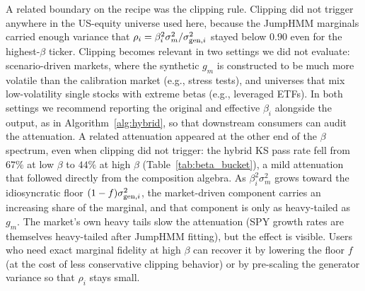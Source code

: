 A related boundary on the recipe was the clipping rule. Clipping
did not trigger anywhere in the US-equity universe used here,
because the JumpHMM marginals carried enough variance that
$\rho_i = \beta_i^2 \sigma_m^2 / \sigma_{\mathrm{gen},i}^2$ stayed below $0.90$
even for the highest-$\beta$ ticker. Clipping becomes relevant in two
settings we did not evaluate: scenario-driven markets, where the
synthetic $g_m$ is constructed to be much more volatile than the
calibration market (e.g., stress tests), and universes that mix
low-volatility single stocks with extreme betas (e.g., leveraged ETFs).
In both settings we recommend reporting the original and effective
$\beta_i$ alongside the output, as in Algorithm~\ref{alg:hybrid}, so
that downstream consumers can audit the attenuation. A related
attenuation appeared at the other end of the $\beta$ spectrum, even
when clipping did not trigger: the hybrid KS pass rate fell from
$67\%$ at low $\beta$ to $44\%$ at high $\beta$
(Table~\ref{tab:beta_bucket}), a mild attenuation that followed
directly from the composition algebra. As
$\beta_i^2 \sigma_m^2$ grows toward the idiosyncratic floor
$(1 - f)\sigma_{\mathrm{gen},i}^2$, the market-driven component carries an
increasing share of the marginal, and that component is only as
heavy-tailed as $g_m$. The market's own heavy tails slow the attenuation
(SPY growth rates are themselves heavy-tailed after JumpHMM fitting),
but the effect is visible. Users who need exact marginal fidelity at
high $\beta$ can recover it by lowering the floor $f$ (at the cost of
less conservative clipping behavior) or by pre-scaling the generator
variance so that $\rho_i$ stays small.

